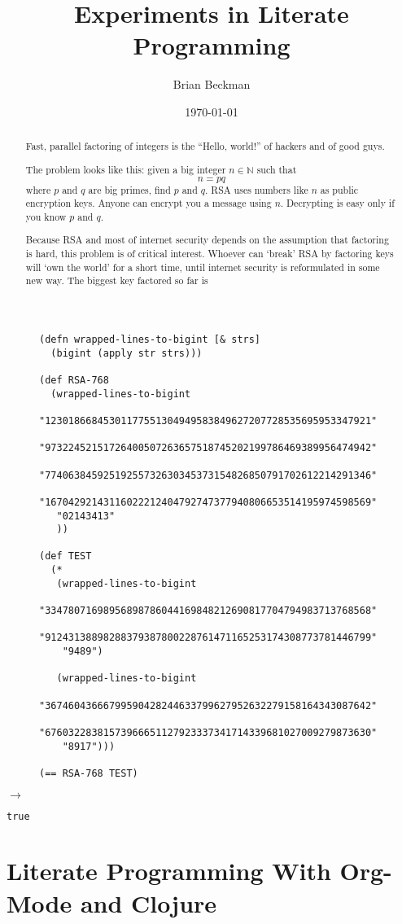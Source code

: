 \documentclass[11pt]{article}
\author{Brian Beckman}
\date{\today}
\title{Experiments in Literate Programming}
\begin{document}
\maketitle
\tableofcontents

\begin{abstract}
Fast, parallel factoring of integers is the ``Hello, world!''
of hackers and of good guys.

The problem looks like this: given a big integer $n\in\mathbb{N}$ such
 that \[n = p q\] where $p$ and $q$
are big primes, find $p$ and $q$.  RSA uses numbers like $n$ as public encryption
keys. Anyone can encrypt you a message using $n$.
Decrypting is easy only if you know $p$ and $q$.

Because RSA and most of 
internet security depends on the assumption that factoring is
hard, this problem is of critical interest. Whoever can
`break' RSA by factoring keys will `own the world' for a short time,
until internet security is reformulated in some new way. The biggest
key factored so far is
\end{abstract}

\begin{figure}[H]
\label{biggest-factored-rsa-key}
\begin{verbatim}
(defn wrapped-lines-to-bigint [& strs]
  (bigint (apply str strs)))

(def RSA-768
  (wrapped-lines-to-bigint
   "12301866845301177551304949583849627207728535695953347921"
   "97322452151726400507263657518745202199786469389956474942"
   "77406384592519255732630345373154826850791702612214291346"
   "16704292143116022212404792747377940806653514195974598569"
   "02143413"
   ))

(def TEST
  (*
   (wrapped-lines-to-bigint
    "33478071698956898786044169848212690817704794983713768568"
    "91243138898288379387800228761471165253174308773781446799"
    "9489")

   (wrapped-lines-to-bigint
    "36746043666799590428244633799627952632279158164343087642"
    "67603228381573966651127923337341714339681027009279873630"
    "8917")))

(== RSA-768 TEST)
\end{verbatim}
\end{figure}
$\longrightarrow$
\begin{verbatim}
true
\end{verbatim}

\section{Literate Programming With Org-Mode and Clojure}
\label{sec-1}
\end{document}
